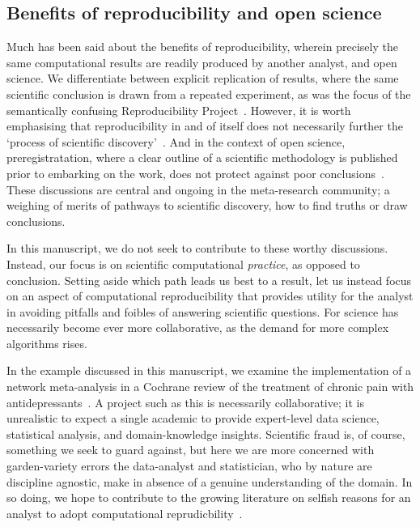 \documentclass{article}\usepackage[]{graphicx}\usepackage[]{color}
\begin{document}
\subsection{Benefits of reproducibility and open science}

Much has been said about the benefits of reproducibility, wherein precisely the same computational results are readily produced by another analyst, and open science. We differentiate between explicit replication of results, where the same scientific conclusion is drawn from a repeated experiment, as was the focus of the  semantically confusing Reproducibility Project~\cite{collaboration_2015}.  However, it is worth emphasising that reproducibility in and of itself does not necessarily further the `process of scientific discovery'~\cite{devezer_2019}. And in the context of open science, preregistratation, where a clear outline of a scientific methodology is published prior to embarking on the work, does not protect against poor conclusions~\cite{szollosi_2019b}. These discussions are central and ongoing in the meta-research community; a weighing of merits of pathways to scientific discovery, how to find truths or draw conclusions.

In this manuscript, we do not seek to contribute to these worthy discussions. Instead, our focus is on scientific computational \emph{practice}, as opposed to conclusion. Setting aside which path leads us best to a result, let us instead focus on an aspect of computational reproducibility that provides utility for the analyst in avoiding pitfalls and foibles of answering scientific questions. For science has necessarily become ever more collaborative, as the demand for more complex algorithms rises. 

In the example discussed in this manuscript, we examine the implementation of a network meta-analysis in a Cochrane review of the treatment of chronic pain with antidepressants~\cite{birkinshaw_2021}. A project such as this is necessarily collaborative; it is unrealistic to expect a single academic to provide expert-level data science, statistical analysis, and domain-knowledge insights. Scientific fraud is, of course, something we seek to guard against, but here we are more concerned with garden-variety errors the data-analyst and statistician, who by nature are discipline agnostic, make in absence of a genuine understanding of the domain. In so doing, we hope to contribute to the growing literature on selfish reasons for an analyst to adopt computational reprudicbility~\cite{markowetz_2015}.
\end{document}
